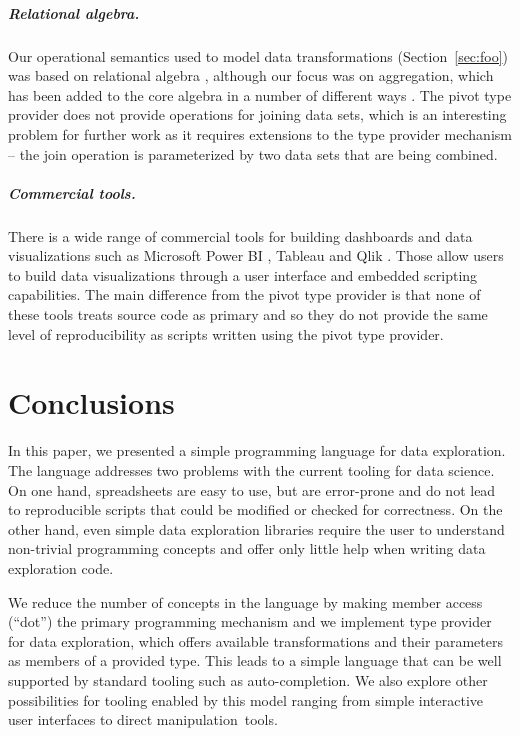 \documentclass[a4paper,UKenglish]{lipics-v2016}
\theoremstyle{plain}
\theoremstyle{definition}
\begin{document}
\vspace{-0.25em}
\subparagraph{Relational algebra.}
Our operational semantics used to model data transformations (Section~\ref{sec:foo}) was based on 
relational algebra \cite{relalg,dbsys}, although our focus was on aggregation, which has been 
added to the core algebra in a number of different ways \cite{sumtables,datacube,relalg-alpha,relalg-sparql}.
The pivot type provider does not provide operations for joining data sets, which is an interesting
problem for further work as it requires extensions to the type provider mechanism -- the join
operation is parameterized by two data sets that are being combined.

\vspace{-0.25em}
\subparagraph{Commercial tools.}
There is a wide range of commercial tools for building dashboards and data visualizations such as
Microsoft Power BI \cite{powerbi}, Tableau \cite{tableau} and Qlik \cite{qlik}. Those allow users
to build data visualizations through a user interface and embedded scripting capabilities. 
The main difference from the pivot type provider is that none of these tools treats source code
as primary and so they do not provide the same level of reproducibility as scripts written using
the pivot type provider.


\section{Conclusions}
In this paper, we presented a simple programming language for data exploration. The language 
addresses two problems with the current tooling for data science. On one hand, spreadsheets are 
easy to use, but are error-prone and do not lead to reproducible scripts that could be modified
or checked for correctness. On the other hand, even simple data exploration libraries require 
the user to understand non-trivial programming concepts and offer only little help when writing 
data exploration code.

We reduce the number of concepts in the language by making member access (``dot'') the primary
programming mechanism and we implement type provider for data exploration, which offers 
available transformations and their parameters as members of a provided type. This leads to a 
simple language that can be well supported by standard tooling such as auto-completion. 
We also explore other possibilities for tooling enabled by this model ranging from 
simple interactive user interfaces to direct manipulation~tools.
\end{document}
